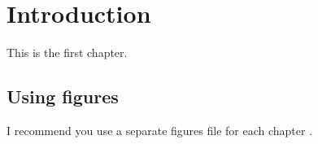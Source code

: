 \chapter{Introduction}

This is the first chapter.

\section{Using figures}
I recommend you use a separate figures file for each chapter \parencite{nietzsche1992as}.